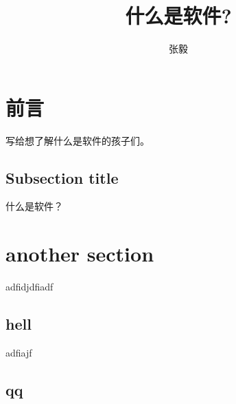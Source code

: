 \documentclass{article}
\title{什么是软件?}
\author{张毅}
\begin{document}
\maketitle
\tableofcontents
\newpage
\section{前言}
写给想了解什么是软件的孩子们。
\subsection{Subsection title}
什么是软件？
\section{another section}
adfidjdfiadf
\subsection{hell}
adfiajf
\subsection{qq}
\end{document}
